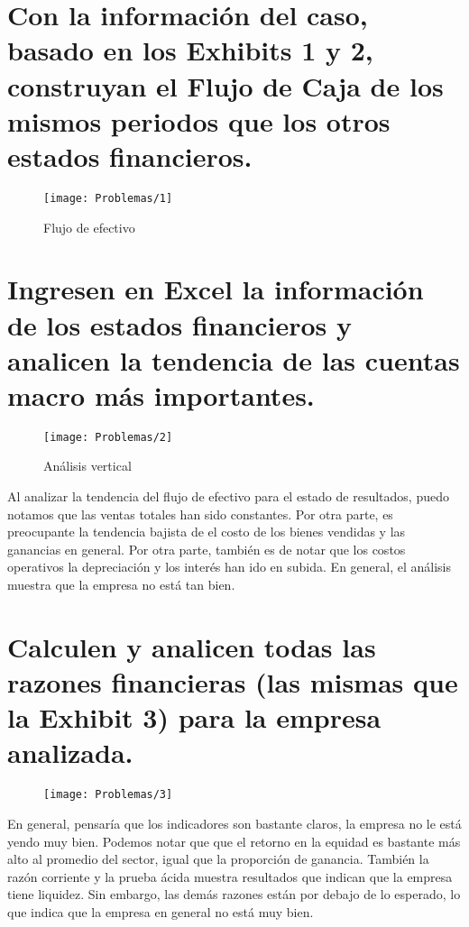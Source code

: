 





\section{Con la información del caso, basado en los Exhibits 1 y 2, construyan el Flujo de Caja de los mismos periodos que los otros estados financieros.}

\begin{figure}[H]
    \centering
    \texttt{[image: Problemas/1]}
    \caption{Flujo de efectivo}
\end{figure}

\section{Ingresen en Excel la información de los estados financieros y analicen la tendencia de las cuentas macro más importantes.}

\begin{figure}[H]
    \centering
    \texttt{[image: Problemas/2]}
    \caption{Análisis vertical}
\end{figure}

Al analizar la tendencia del flujo de efectivo para el estado de resultados, puedo notamos que las ventas totales han sido constantes. Por otra parte, es preocupante la tendencia bajista de el costo de los bienes vendidas y las ganancias en general. Por otra parte, también es de notar que los costos operativos la depreciación y los interés han ido en subida. En general, el análisis muestra que la empresa no está tan bien. 


\section{Calculen y analicen todas las razones financieras (las mismas que la Exhibit 3) para la empresa analizada.}


\begin{figure}[H]
    \centering
    \texttt{[image: Problemas/3]}
\end{figure}

En general, pensaría que los indicadores son bastante claros, la empresa no le está yendo muy bien. Podemos notar que que el retorno en la equidad es bastante más alto al promedio del sector, igual que la proporción de ganancia. También la razón corriente y la prueba ácida muestra resultados que indican que la empresa tiene liquidez. Sin embargo, las demás razones están por debajo de lo esperado, lo que indica que la empresa en general no está muy bien. 

